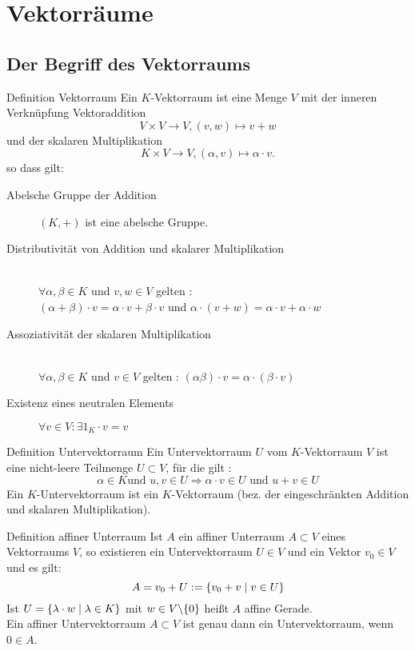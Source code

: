 \documentclass[main.tex]{subfiles}
\begin{document}
\section*{Vektorräume}
\subsection*{Der Begriff des Vektorraums}
\begin{karte}{Definition Vektorraum}
    Ein \( K \)-Vektorraum ist eine Menge \(V\) mit der inneren 
    Verknüpfung Vektoraddition 
    \[ V \times V \rightarrow V, (v,w) \mapsto v + w \]
    und der skalaren Multiplikation 
    \[ K \times V \rightarrow V, (\alpha, v) \mapsto 
    \alpha \cdot v. \]
    so dass gilt: 
    \begin{description}
        \item[Abelsche Gruppe der Addition]
        \( (K,+) \) ist eine abelsche Gruppe.  
        \item[Distributivität von Addition und skalarer Multiplikation] \hfill \\ 
        \( \forall \alpha, \beta \in K\) und \( v, w \in V\) gelten : \\
        \( (\alpha + \beta) \cdot v =  \alpha \cdot v + \beta \cdot v\)
        und 
        \( \alpha \cdot ( v + w) = \alpha \cdot v + \alpha \cdot w\)
        \item[Assoziativität der skalaren Multiplikation] \hfill \\
        \( \forall \alpha, \beta \in K\) und \( v \in V\) gelten :
        \((\alpha \beta) \cdot v = \alpha \cdot (\beta \cdot v)\)
        \item[Existenz eines neutralen Elements]
        \( \forall v \in V : \exists 1_K \cdot v = v\)
    \end{description}
\end{karte}
\begin{karte}{Definition Untervektorraum}
    Ein Untervektorraum \(U\) vom \(K\)-Vektorraum \(V\) ist eine nicht-leere
    Teilmenge \(U \subset V\), für die gilt : 
    \[\alpha \in K \text {und } u, v \in U \Rightarrow \alpha \cdot v \in U
    \text{ und } u + v \in U\]
    Ein \(K\)-Untervektorraum ist ein \(K\)-Vektorraum 
    (bez. der eingeschränkten Addition und skalaren Multiplikation).
\end{karte}
\begin{karte}{Definition affiner Unterraum}
    Ist \(A\) ein affiner Unterraum \(A \subset V\) eines Vektorraums \(V\),
    so existieren ein Untervektorraum \(U \in V\) und ein Vektor \(v_0 \in V\) 
    und es gilt: 
    \[A = v_0 + U := \{v_0 + v \;\vert\; v \in U\}\] 
    Ist \(U = \{\lambda \cdot w \;\vert\; \lambda \in K\}\) 
    mit \(w \in V \backslash \{0\}\) heißt \(A\) affine Gerade. \\
    Ein affiner Untervektorraum \(A \subset V\) ist genau 
    dann ein Untervektorraum, wenn \(0 \in A\).
\end{karte}
\end{document}

